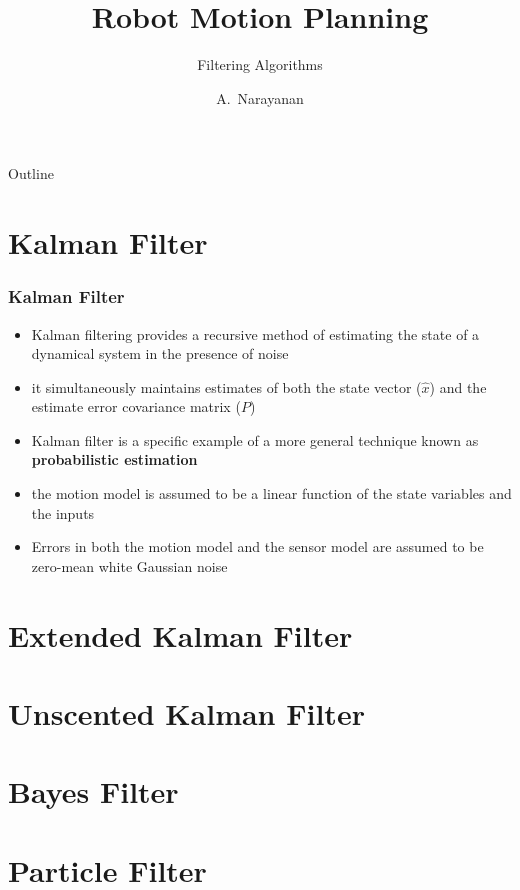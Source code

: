 \documentclass[handout]{beamer}
\title[RMP v\var{version}]
{Robot Motion Planning}
\subtitle
{Filtering Algorithms}
\author[Narayanan]
{A.~Narayanan\inst{1}}
\institute[Technical University of Munich]
{
  \inst{1}
  Department of Informatics\\
}
\date{}
\begin{document}
\begin{frame}
    \titlepage
  \end{frame}
  
  \begin{frame}{Outline}
    \tableofcontents
  \end{frame}

  \section[]{Kalman Filter}

  \begin{frame}
    \frametitle{Kalman Filter}
  
    \begin{itemize}
        \item Kalman filtering provides a recursive method of estimating the state of a dynamical system in the presence of noise
        \item it simultaneously maintains estimates of both the state vector ($\hat{x}$) and the estimate error covariance matrix ($P$)
        \item Kalman filter is a specific example of a more general technique known as \textbf{probabilistic estimation}
        \item the motion model is assumed to be a linear function of the state variables and the inputs
        \item Errors in both the motion model and the sensor model are assumed to be zero-mean white Gaussian noise
    \end{itemize}
  
  \end{frame}

  \section[]{Extended Kalman Filter}

  \section[]{Unscented Kalman Filter}

  \section[]{Bayes Filter}

  \section[]{Particle Filter}
\end{document}
